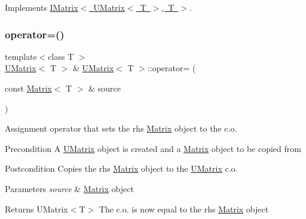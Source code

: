 Implements \mbox{\hyperlink{class_i_matrix_a9eeb68de7e1d37d1aab439c78fea9be3}{I\+Matrix$<$ U\+Matrix$<$ T $>$, T $>$}}.

\mbox{\label{class_u_matrix_a98d77665ae6c6dd8c264d7aca57d76fd}} 
\subsubsection{\texorpdfstring{operator=()}{operator=()}\hspace{0.1cm}{\footnotesize\ttfamily [2/2]}}
{\footnotesize\ttfamily template$<$class T $>$ \\
\mbox{\hyperlink{class_u_matrix}{U\+Matrix}}$<$ T $>$ \& \mbox{\hyperlink{class_u_matrix}{U\+Matrix}}$<$ T $>$\+::operator= (\begin{DoxyParamCaption}\item[{const \mbox{\hyperlink{class_matrix}{Matrix}}$<$ T $>$ \&}]{source }\end{DoxyParamCaption})}



Assignment operator that sets the rhs \mbox{\hyperlink{class_matrix}{Matrix}} object to the c.\+o. 

\begin{DoxyPrecond}{Precondition}
A \mbox{\hyperlink{class_u_matrix}{U\+Matrix}} object is created and a \mbox{\hyperlink{class_matrix}{Matrix}} object to be copied from 
\end{DoxyPrecond}
\begin{DoxyPostcond}{Postcondition}
Copies the rhs \mbox{\hyperlink{class_matrix}{Matrix}} object to the \mbox{\hyperlink{class_u_matrix}{U\+Matrix}} c.\+o. 
\end{DoxyPostcond}

\begin{DoxyParams}{Parameters}
{\em source} & \mbox{\hyperlink{class_matrix}{Matrix}} object \\
\hline
\end{DoxyParams}
\begin{DoxyReturn}{Returns}
U\+Matrix$<$\+T$>$ The c.\+o. is now equal to the rhs \mbox{\hyperlink{class_matrix}{Matrix}} object 
\end{DoxyReturn}
\mbox{\label{class_u_matrix_a0dea1e82fbf5ae67bec479c070b185dc}} 
